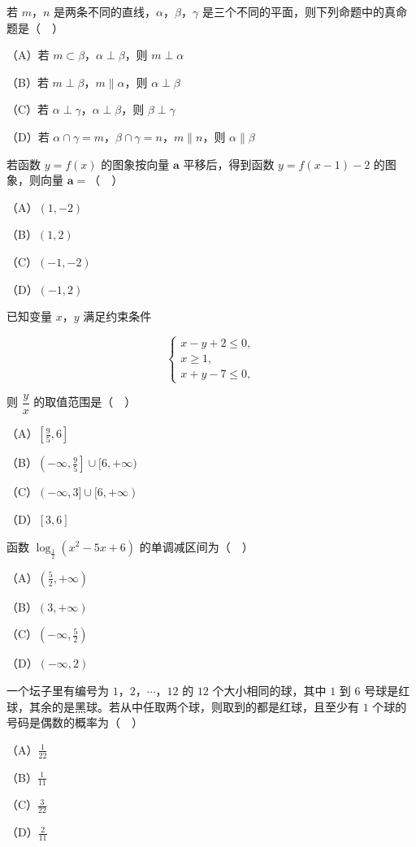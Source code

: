 \begin{question}
若 $m$，$n$ 是两条不同的直线，$\alpha$，$\beta$，$\gamma$ 是三个不同的平面，则下列命题中的真命题是（　）

（A）若 $m\subset\beta$，$\alpha\perp\beta$，则 $m\perp\alpha$

（B）若 $m\perp\beta$，$m\parallel\alpha$，则 $\alpha\perp\beta$

（C）若 $\alpha\perp\gamma$，$\alpha\perp\beta$，则 $\beta\perp\gamma$

（D）若 $\alpha\cap\gamma=m$，$\beta\cap\gamma=n$，$m\parallel n$，则 $\alpha\parallel\beta$

\end{question}
\begin{question}
若函数 $y=f(x)$ 的图象按向量 $\boldsymbol a$ 平移后，得到函数 $y=f(x-1)-2$ 的图象，则向量 $\boldsymbol a=$（　）

（A）$(1,-2)$

（B）$(1,2)$

（C）$(-1,-2)$

（D）$(-1,2)$

\end{question}
\begin{question}
已知变量 $x$，$y$ 满足约束条件

\nopagebreak[4]
\[\begin{cases}x-y+2\leqslant0,\\ x\geqslant1,\\ x+y-7\leqslant0,\end{cases}\]

则 $\dfrac yx$ 的取值范围是（　）

（A）$\left[\frac95,6\right]$

（B）$\left(-\infty,\frac95\right]\cup[6,+\infty)$

（C）$(-\infty,3]\cup[6,+\infty)$

（D）$[3,6]$

\end{question}
\begin{question}
函数 $\log_{\frac12}(x^2-5x+6)$ 的单调减区间为（　）

（A）$\left(\frac52,+\infty\right)$

（B）$(3,+\infty)$

（C）$\left(-\infty,\frac52\right)$

（D）$(-\infty,2)$

\end{question}
\begin{question}
一个坛子里有编号为 $1$，$2$，$\cdots$，$12$ 的 $12$ 个大小相同的球，其中 $1$ 到 $6$ 号球是红球，其余的是黑球。若从中任取两个球，则取到的都是红球，且至少有 $1$ 个球的号码是偶数的概率为（　）

（A）$\frac1{22}$

（B）$\frac1{11}$

（C）$\frac3{22}$

（D）$\frac2{11}$

\end{question}
